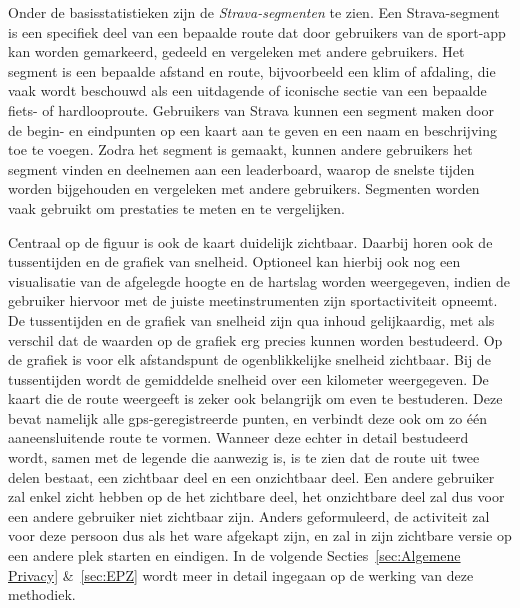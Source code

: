 Onder de basisstatistieken zijn de \textit{Strava-segmenten} te zien. Een
Strava-segment is een specifiek deel van een bepaalde route dat door gebruikers
van de sport-app kan worden gemarkeerd, gedeeld en vergeleken met andere
gebruikers. Het segment is een bepaalde afstand en route, bijvoorbeeld een klim
of afdaling, die vaak wordt beschouwd als een uitdagende of iconische sectie
van een bepaalde fiets- of hardlooproute. Gebruikers van Strava kunnen een
segment maken door de begin- en eindpunten op een kaart aan te geven en een
naam en beschrijving toe te voegen. Zodra het segment is gemaakt, kunnen andere
gebruikers het segment vinden en deelnemen aan een leaderboard, waarop de
snelste tijden worden bijgehouden en vergeleken met andere gebruikers.
Segmenten worden vaak gebruikt om prestaties te meten en te vergelijken.

Centraal op de figuur is ook de kaart duidelijk zichtbaar. Daarbij horen ook de
tussentijden en de grafiek van snelheid. Optioneel kan hierbij ook nog een
visualisatie van de afgelegde hoogte en de hartslag worden weergegeven, indien
de gebruiker hiervoor met de juiste meetinstrumenten zijn sportactiviteit
opneemt. De tussentijden en de grafiek van snelheid zijn qua inhoud
gelijkaardig, met als verschil dat de waarden op de grafiek erg precies kunnen
worden bestudeerd. Op de grafiek is voor elk afstandspunt de ogenblikkelijke
snelheid zichtbaar. Bij de tussentijden wordt de gemiddelde snelheid over een
kilometer weergegeven. De kaart die de route weergeeft is zeker ook belangrijk
om even te bestuderen. Deze bevat namelijk alle \ac{gps}-geregistreerde punten,
en verbindt deze ook om zo één aaneensluitende route te vormen. Wanneer deze
echter in detail bestudeerd wordt, samen met de legende die aanwezig is, is te
zien dat de route uit twee delen bestaat, een zichtbaar deel en een onzichtbaar
deel. Een andere gebruiker zal enkel zicht hebben op de het zichtbare deel, het
onzichtbare deel zal dus voor een andere gebruiker niet zichtbaar zijn. Anders
geformuleerd, de activiteit zal voor deze persoon dus als het ware afgekapt
zijn, en zal in zijn zichtbare versie op een andere plek starten en eindigen.
In de volgende Secties~\ref{sec:Algemene Privacy} \&~\ref{sec:EPZ} wordt meer
in detail ingegaan op de werking van deze methodiek.

